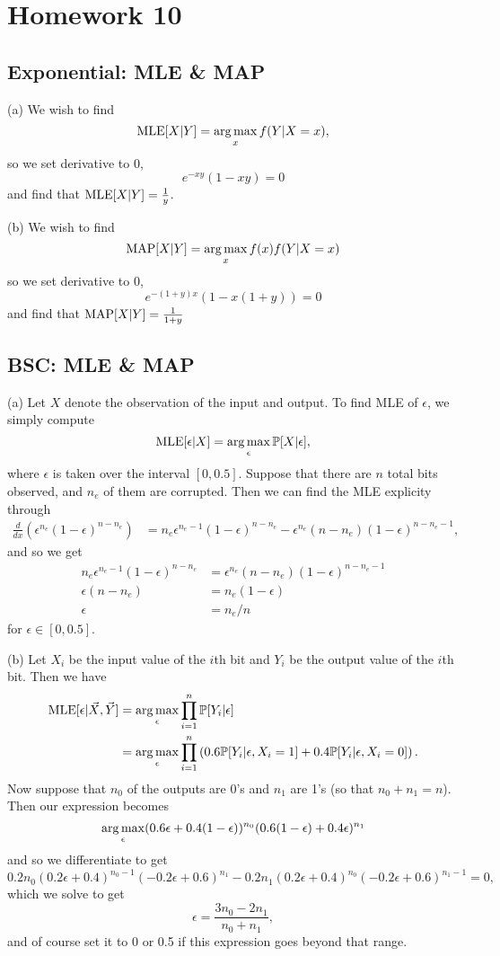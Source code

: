 \section{Homework 10}


\subsection{Exponential: MLE \& MAP}
(a) We wish to find
\[
\text{MLE}[X | Y] = \operatorname*{arg\,max}_x f(Y | X = x),
\]
so we set derivative to 0,
\[
e^{-xy}(1 - xy) = 0
\]
and find that $\text{MLE}[X | Y] = \frac{1}{y}$.

(b) We wish to find
\[
\text{MAP}[X | Y] = \operatorname*{arg\,max}_x f(x)f(Y | X = x)
\]
so we set derivative to 0,
\[
e^{-(1 + y)x}(1 - x(1 + y)) = 0
\]
and find that $\text{MAP}[X | Y] = \frac{1}{1+y}$


\subsection{BSC: MLE \& MAP}
(a) Let $X$ denote the observation of the input and output. To find MLE of $\epsilon$, we simply compute
\[
\text{MLE}[\epsilon | X] = \operatorname*{arg\,max}_\epsilon \mathbb{P}[X | \epsilon],
\]
where $\epsilon$ is taken over the interval $[0, 0.5]$. Suppose that there are $n$ total bits observed, and $n_e$ of them are corrupted. Then we can find the MLE explicity through
\begin{align*}
    \frac{d}{dx}\left(\epsilon^{n_e}(1 - \epsilon)^{n - n_e}\right) &= n_e\epsilon^{n_e - 1}(1 - \epsilon)^{n - n_e} - \epsilon^{n_e}(n - n_e)(1 - \epsilon)^{n - n_e - 1},
\end{align*}
and so we get
\begin{align*}
    n_e\epsilon^{n_e - 1}(1 - \epsilon)^{n - n_e} &= \epsilon^{n_e}(n - n_e)(1 - \epsilon)^{n - n_e - 1} \\
    \epsilon(n - n_e) &= n_e(1 - \epsilon) \\
    \epsilon &= n_e / n
\end{align*}
for $\epsilon \in [0, 0.5]$.


(b) Let $X_i$ be the input value of the $i$th bit and $Y_i$ be the output value of the $i$th bit. Then we have
\begin{align*}
    \text{MLE}[\epsilon | \vec{X}, \vec{Y}] &= \operatorname*{arg\,max}_\epsilon \prod_{i = 1}^n\mathbb{P}[Y_i | \epsilon] \\
    &= \operatorname*{arg\,max}_\epsilon \prod_{i = 1}^n\left(0.6\mathbb{P}[Y_i | \epsilon, X_i = 1] + 0.4\mathbb{P}[Y_i | \epsilon, X_i = 0]\right).
\end{align*}
Now suppose that $n_0$ of the outputs are 0's and $n_1$ are 1's (so that $n_0 + n_1 = n$). Then our expression becomes
\[
\operatorname*{arg\,max}_\epsilon (0.6\epsilon + 0.4(1 - \epsilon))^{n_0}(0.6(1 - \epsilon) + 0.4\epsilon)^{n_1}
\]
and so we differentiate to get
\[
0.2n_0(0.2\epsilon + 0.4)^{n_0 - 1}(-0.2\epsilon + 0.6)^{n_1} - 0.2n_1(0.2\epsilon + 0.4)^{n_0}(-0.2\epsilon + 0.6)^{n_1 - 1} = 0,
\]
which we solve to get
\[
\epsilon = \frac{3n_0 - 2n_1}{n_0 + n_1},
\]
and of course set it to 0 or 0.5 if this expression goes beyond that range.

